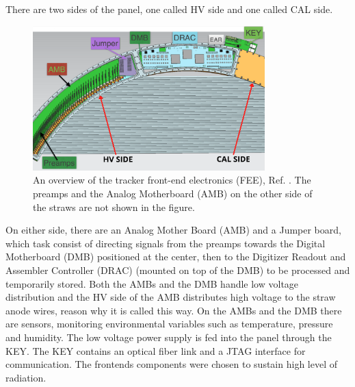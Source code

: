 There are two sides of the panel, one called HV side and one called CAL side. 
\begin{figure}[!h]
\centering
\includegraphics[width =0.8\textwidth]{figures/png/Screenshot_20240131_111836.png}
\caption{An overview of the tracker front-end electronics (FEE), Ref.  
\cite{vadimmu2e}. The preamps and the Analog Motherboard (AMB) 
on the other side of the straws are not shown in the figure.}
\label{fig:trackerfee}
\end{figure}
On either side, there are an Analog Mother Board (AMB) and a Jumper board, 
which task consist of directing signals from the preamps towards the Digital 
Motherboard (DMB) positioned at the center, then to the Digitizer Readout and 
Assembler Controller (DRAC) (mounted on top of the DMB) to be processed and 
temporarily stored. Both the AMBs and the DMB handle low voltage distribution 
and the HV side of the AMB distributes high voltage to the straw anode wires, 
reason why it is called this way. On the AMBs and the DMB there are sensors, 
monitoring environmental variables such as temperature, pressure and humidity. 
The low voltage power supply is fed into the panel through the KEY. The KEY 
contains an optical fiber link and a JTAG interface for communication. The 
frontends components were chosen to sustain high level of radiation.
